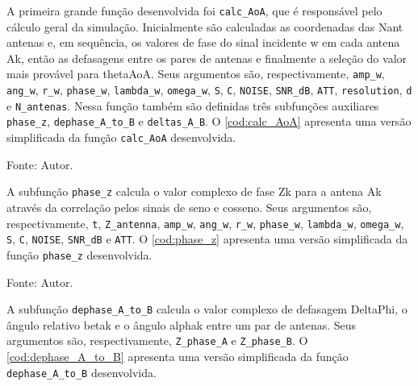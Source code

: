 A primeira grande função desenvolvida foi \lstinline|calc_AoA|, que é responsável pelo cálculo geral da simulação.
Inicialmente são calculadas as coordenadas das \ac{Nant} antenas e, em sequência, os valores de fase do sinal incidente \ac{w} em cada antena \ac{Ak}, então as defasagens entre os pares de antenas e finalmente a seleção do valor mais provável para \ac{thetaAoA}.
Seus argumentos são, respectivamente, \lstinline|amp_w|, \lstinline|ang_w|, \lstinline|r_w|, \lstinline|phase_w|, \lstinline|lambda_w|, \lstinline|omega_w|, \lstinline|S|, \lstinline|C|, \lstinline|NOISE|, \lstinline|SNR_dB|, \lstinline|ATT|, \lstinline|resolution|, \lstinline|d| e \lstinline|N_antenas|.
Nessa função também são definidas três subfunções auxiliares \lstinline|phase_z|, \lstinline|dephase_A_to_B| e \lstinline|deltas_A_B|.
O \autoref{cod:calc_AoA} apresenta uma versão simplificada da função \lstinline|calc_AoA| desenvolvida.

\begin{lstfloat}[htbp]
	\centering
	
	\caption*{Fonte: Autor.}
\end{lstfloat}

A subfunção \lstinline|phase_z| calcula o valor complexo de fase \ac{Zk} para a antena \ac{Ak} através da correlação pelos sinais de seno e cosseno.
Seus argumentos são, respectivamente, \lstinline|t|, \lstinline|Z_antenna|, \lstinline|amp_w|, \lstinline|ang_w|, \lstinline|r_w|, \lstinline|phase_w|, \lstinline|lambda_w|, \lstinline|omega_w|, \lstinline|S|, \lstinline|C|, \lstinline|NOISE|, \lstinline|SNR_dB| e \lstinline|ATT|.
O \autoref{cod:phase_z} apresenta uma versão simplificada da função \lstinline|phase_z| desenvolvida.

\begin{lstfloat}[htbp]
	\centering
	
	\caption*{Fonte: Autor.}
\end{lstfloat}

A subfunção \lstinline|dephase_A_to_B| calcula o valor complexo de defasagem \ac{DeltaPhi}, o ângulo relativo \ac{betak} e o ângulo \ac{alphak} entre um par de antenas.
Seus argumentos são, respectivamente, \lstinline|Z_phase_A| e \lstinline|Z_phase_B|.
O \autoref{cod:dephase_A_to_B} apresenta uma versão simplificada da função \lstinline|dephase_A_to_B| desenvolvida.

